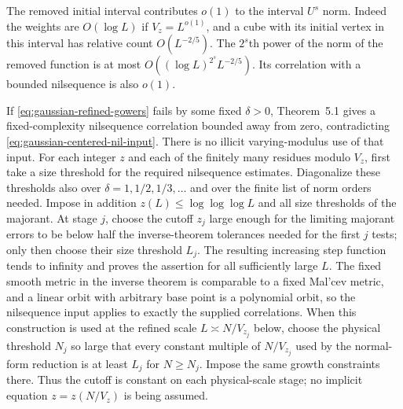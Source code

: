 The removed initial interval contributes $o(1)$ to the interval $U^s$
norm. Indeed the weights are $O(\log L)$ if $V_z=L^{o(1)}$, and a cube
with its initial vertex in this interval has relative count
$O(L^{-2/5})$. The $2^s$th power of the norm of the removed function is
at most $O((\log L)^{2^s}L^{-2/5})$. Its correlation with a bounded
nilsequence is also $o(1)$.

If \eqref{eq:gaussian-refined-gowers} fails by some fixed $\delta>0$,
Theorem~5.1 gives a fixed-complexity nilsequence correlation bounded
away from zero, contradicting \eqref{eq:gaussian-centered-nil-input}.
There is no illicit varying-modulus use of that input. For each integer
$z$ and each of the finitely many residues modulo $V_z$, first take a
size threshold for the required nilsequence estimates. Diagonalize
these thresholds also over $\delta=1,1/2,1/3,\ldots$ and over the finite
list of norm orders needed. Impose in addition
$z(L)\leq\log\log\log L$ and all size thresholds of the majorant.
At stage $j$, choose the cutoff $z_j$ large enough for the limiting
majorant errors to be below half the inverse-theorem tolerances needed
for the first $j$ tests; only then choose their size threshold $L_j$.
The resulting increasing step function tends to infinity and proves
the assertion for all sufficiently large $L$. The fixed smooth metric
in the inverse theorem is comparable to a fixed Mal'cev metric, and a
linear orbit with arbitrary base point is a polynomial orbit, so the
nilsequence input applies to exactly the supplied correlations.
When this construction is used at the refined scale $L\asymp N/V_{z_j}$
below, choose the physical threshold $N_j$ so large that every constant
multiple of $N/V_{z_j}$ used by the normal-form reduction is at least
$L_j$ for $N\geq N_j$. Impose the same growth constraints there.
Thus the cutoff is constant on each physical-scale stage; no implicit
equation $z=z(N/V_z)$ is being assumed.

